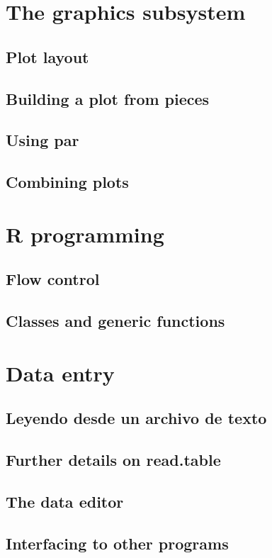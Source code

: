 \documentclass[spanish]{extbook}
\numberwithin{equation}{section}
\numberwithin{figure}{section}
\begin{document}
\section{The graphics subsystem}
\subsection{Plot layout}
\subsection{Building a plot from pieces}
\subsection{Using par}
\subsection{Combining plots}

\section{R programming}
\subsection{Flow control}
\subsection{Classes and generic functions}

\section{Data entry}
\subsection{Leyendo desde un archivo de texto} \label{readtextfile}
\subsection{Further details on read.table}
\subsection{The data editor}
\subsection{Interfacing to other programs}
\end{document}
